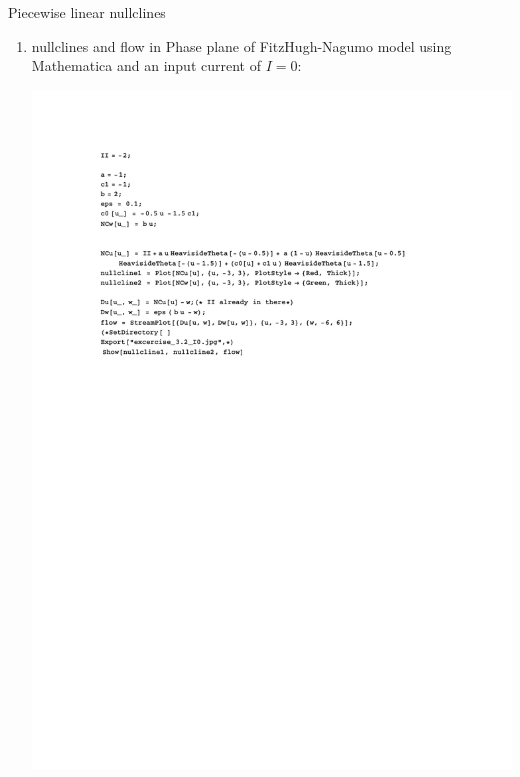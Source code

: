 \documentclass[12pt]{article}
\newenvironment{exercise}[2][Exercise]{\begin{trivlist}
\item[\hskip \labelsep {\bfseries #1}\hskip \labelsep {\bfseries #2.}]}{\end{trivlist}}
\begin{document}
\begin{exercise}{3.2}
Piecewise linear nullclines \\
\renewcommand{\labelenumi}{\alph{enumi})}
\begin{enumerate}
\item nullclines and flow in Phase plane of FitzHugh-Nagumo model using Mathematica and an input current of $I=0$:

	\includegraphics[width=5.2in]{code_32}


\end{enumerate}
\end{exercise}
\end{document}
